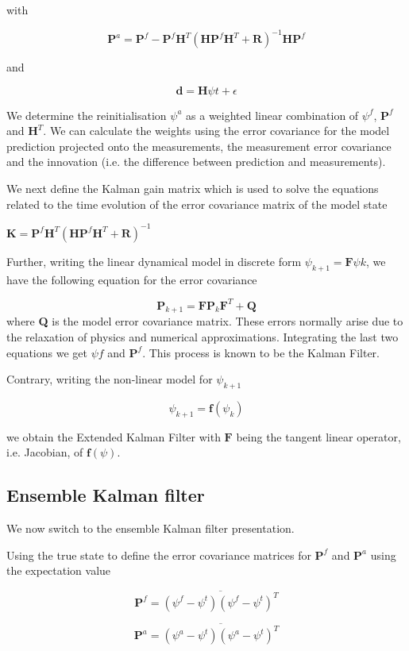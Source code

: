 \documentclass[a4,12pt]{article}
\numberwithin{equation}{section}
\begin{document}
with

$$\textbf{P}^{a} = \textbf{P}^{f} - \textbf{P}^{f}\textbf{H}^{T}(\textbf{HP}^{f}\textbf{H}^{T}+\textbf{R})^{-1}\textbf{HP}^{f} $$

and 

$$\textbf{d} = \textbf{H}\psi{t} + \epsilon$$

We determine the reinitialisation $\psi^{a}$ as a weighted linear combination of $\psi^{f}$, $\textbf{P}^{f}$ and $\textbf{H}^{T}$. We can calculate the weights using the error covariance for the model prediction projected onto the measurements, the measurement error covariance and the innovation (i.e. the difference between prediction and measurements).     

We next define the Kalman gain matrix which is used to solve the equations related to the time evolution of the error covariance matrix of the model state

$\textbf{K} = \textbf{P}^{f}\textbf{H}^{T}(\textbf{H}\textbf{P}^{f}\textbf{H}^{T}+\textbf{R})^{-1}$

Further, writing the linear dynamical model in discrete form $\psi_{k+1}=\textbf{F}\psi{k}$, we have the following equation for the error covariance

$$\textbf{P}_{k+1}=\textbf{F}\textbf{P}_{k}\textbf{F}^{T}+\textbf{Q}$$
where \textbf{Q} is the model error covariance matrix. These errors normally arise due to the relaxation of physics and numerical approximations. Integrating the last two equations we get $\psi{f}$ and $\textbf{P}^{f}$. This process is known to be the Kalman Filter.

Contrary, writing the non-linear model for $\psi_{k+1}$

$$\psi_{k+1}=\textbf{f}(\psi_{k})$$

we obtain the Extended Kalman Filter with $\textbf{F}$ being the tangent linear operator, i.e. Jacobian, of $\textbf{f}(\psi)$.

\subsection{Ensemble Kalman filter}
We now switch to the ensemble Kalman filter presentation.

Using the true state to define the error covariance matrices for $\textbf{P}^{f}$ and $\textbf{P}^{a}$ using the expectation value 

$$\textbf{P}^{f} = \overline{(\psi^{f}-\psi^{t})(\psi^{f}-\psi^{t})^{T}}$$

$$\textbf{P}^{a} = \overline{(\psi^{a}-\psi^{t})(\psi^{a}-\psi^{t})^{T}}$$
\end{document}
